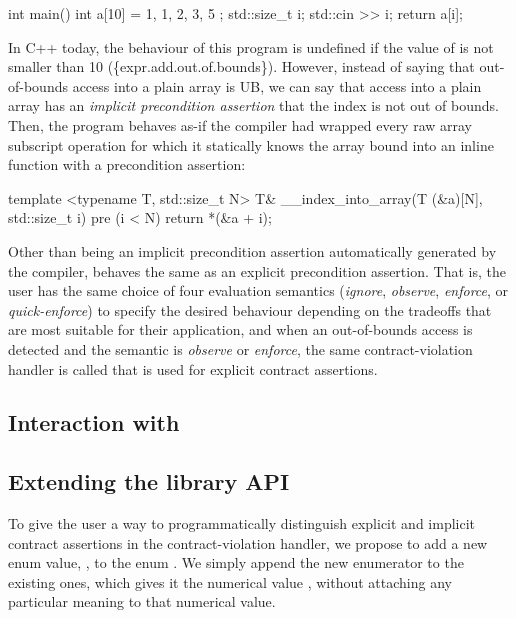\begin{codeblock}
int main() {
  int a[10] = { 1, 1, 2, 3, 5 };
  std::size_t i; 
  std::cin >> i;
  return a[i];
}
\end{codeblock}

In C++ today, the behaviour of this program is undefined if the value of  is not smaller than 10 (\{expr.add.out.of.bounds\}). However, instead of saying that out-of-bounds access into a plain array is UB, we can say that access into a plain array has an \emph{implicit precondition assertion} that the index is not out of bounds. Then, the program behaves as-if the compiler had wrapped every raw array subscript operation for which it statically knows the array bound  into an inline function with a precondition assertion:

\begin{codeblock}
template <typename T, std::size_t N>
T& __index_into_array(T (&a)[N], std::size_t i) 
pre (i < N) {
  return *(&a + i);
}
\end{codeblock}

Other than being an implicit precondition assertion automatically generated by the compiler,  behaves the same as an explicit precondition assertion. That is, the user has the same choice of four evaluation semantics (\emph{ignore}, \emph{observe}, \emph{enforce}, or \emph{quick-enforce}) to specify the desired behaviour depending on the tradeoffs that are most suitable for their application, and when an out-of-bounds access is detected and the semantic is \emph{observe} or \emph{enforce}, the same contract-violation handler is called that is used for explicit contract assertions.

\subsection{Interaction with }


\subsection{Extending the library API}
\label{library}

To give the user a way to programmatically distinguish explicit and implicit contract assertions in the contract-violation handler, we propose to add a new enum value, , to the enum \mbox{}. We simply append the new enumerator to the existing ones, which gives it the numerical value , without attaching any particular meaning to that numerical value.

